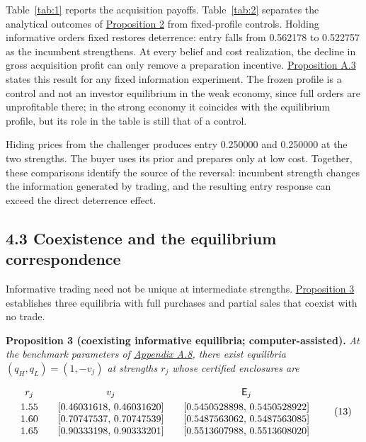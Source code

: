 \documentclass[
  12pt,
]{article}
\begin{document}
Table~\ref{tab:1} reports the acquisition payoffs. Table~\ref{tab:2}
separates the analytical outcomes of
\hyperref[result-proposition-2]{Proposition 2} from fixed-profile
controls. Holding informative orders fixed restores deterrence: entry
falls from 0.562178 to 0.522757 as the incumbent strengthens. At every
belief and cost realization, the decline in gross acquisition profit can
only remove a preparation incentive.
\hyperref[result-proposition-a-3]{Proposition A.3} states this result
for any fixed information experiment. The frozen profile is a control
and not an investor equilibrium in the weak economy, since full orders
are unprofitable there; in the strong economy it coincides with the
equilibrium profile, but its role in the table is still that of a
control.

Hiding prices from the challenger produces entry 0.250000 and 0.250000
at the two strengths. The buyer uses its prior and prepares only at low
cost. Together, these comparisons identify the source of the reversal:
incumbent strength changes the information generated by trading, and the
resulting entry response can exceed the direct deterrence effect.

\subsection{4.3 Coexistence and the equilibrium
correspondence}\label{sec-coexistence-and-the-equilibrium-correspondence}

Informative trading need not be unique at intermediate strengths.
\hyperref[result-proposition-3]{Proposition 3} establishes three
equilibria with full purchases and partial sales that coexist with no
trade.


\protect{}\label{result-proposition-3}{\textbf{Proposition
3 (coexisting informative equilibria; computer-assisted).}} \emph{At the
benchmark parameters of \hyperref[pa-parameters]{Appendix A.8}, there
exist equilibria \((q_H,q_L)=(1,-v_j)\) at strengths \(r_j\) whose
certified enclosures are}

\[
\begin{array}{c@{\qquad}c@{\qquad}c}
r_j&v_j&\mathsf E_j\\[3pt]
1.55&[0.46031618,\,0.46031620]&[0.5450528898,\,0.5450528922]\\
1.60&[0.70747537,\,0.70747539]&[0.5487563062,\,0.5487563085]\\
1.65&[0.90333198,\,0.90333201]&[0.5513607988,\,0.5513608020]
\end{array}
\tag{13}\label{eq:paper-13}
\]
\end{document}
